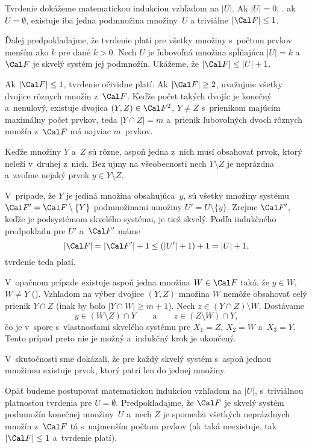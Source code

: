 {%
Tvrdenie dokážeme matematickou indukciou vzhľadom na $|U|$. Ak $|U|=0$, \tj. ak $U=\emptyset$, existuje iba jedna podmnožina množiny~$U$ a triviálne $|\Cal F|\le1$.

Ďalej predpokladajme, že tvrdenie platí pre všetky množiny s~počtom prvkov menším ako $k$ pre dané $k>0$. Nech $U$ je ľubovoľná množina spĺňajúca $|U|=k$ a~$\Cal F$ je skvelý systém jej podmnožín. Ukážeme, že $|\Cal F|\le |U|+1$.

Ak $|\Cal F|\le1$, tvrdenie očividne platí. Ak $|\Cal F|\ge2$, uvažujme všetky dvojice rôznych množín z~$\Cal F$. Keďže počet takých dvojíc je konečný a~nenulový, existuje dvojica ${(Y,Z)\in\Cal F^2}$, $Y\ne Z$ s~prienikom majúcim maximálny počet prvkov, teda $|Y\cap Z|=m$ a~prienik ľubovoľných dvoch rôznych množín z~$\Cal F$ má najviac $m$~prvkov.

Keďže množiny $Y$ a~$Z$ sú rôzne, aspoň jedna z~nich musí obsahovať prvok, ktorý neleží v~druhej z~nich. Bez ujmy na všeobecnosti nech $Y\setminus Z$ je neprázdna a~zvoľme nejaký prvok $y\in Y\setminus Z$.

V~prípade, že $Y$ je jediná množina obsahujúca~$y$, sú všetky množiny systému $\Cal F'=\Cal F\setminus\{Y\}$ podmnožinami množiny $U'=U\setminus\{y\}$. Zrejme $\Cal F'$, keďže je podsystémom skvelého systému, je tiež skvelý. Podľa indukčného predpokladu pre $U'$ a~$\Cal F'$ máme
$$
|\Cal F|=|\Cal F'|+1 \le (|U'|+1)+1 = |U|+1,
$$
tvrdenie teda platí.
%

V~opačnom prípade existuje aspoň jedna množina $W\in\Cal F$ taká, že $y\in W$, $W\ne Y$ (\obr). Vzhľadom na výber dvojice $(Y,Z)$ množina $W$ nemôže obsahovať celý prienik $Y\cap Z$ (inak by bolo $|Y\cap W|\ge m+1$). Nech $z\in (Y\cap Z)\setminus W$. Dostávame
$$
y \in (W\setminus Z) \cap Y\qquad\text{a}\qquad z \in (Z\setminus W) \cap Y,
$$
čo je v~spore s~vlastnosťami skvelého systému pre $X_1=Z$, $X_2=W$ a~$X_3=Y$. Tento prípad preto nie je možný a~indukčný krok je ukončený.

\poznamka
V~skutočnosti sme dokázali, že pre každý skvelý systém s~aspoň jednou množinou existuje prvok, ktorý patrí len do jednej množiny.

\ineriesenie
Opäť budeme postupovať matematickou indukciou vzhľadom na $|U|$, s~triviálnou platnosťou tvrdenia pre $U=\emptyset$. Predpokladajme, že $\Cal F$ je skvelý systém podmnožín konečnej množiny~$U$ a~nech $Z$ je spomedzi všetkých neprázdnych množín z~$\Cal F$ tá s~najmenším počtom prvkov (ak taká neexistuje, tak $|\Cal F|\le1$ a~tvrdenie platí).

}
